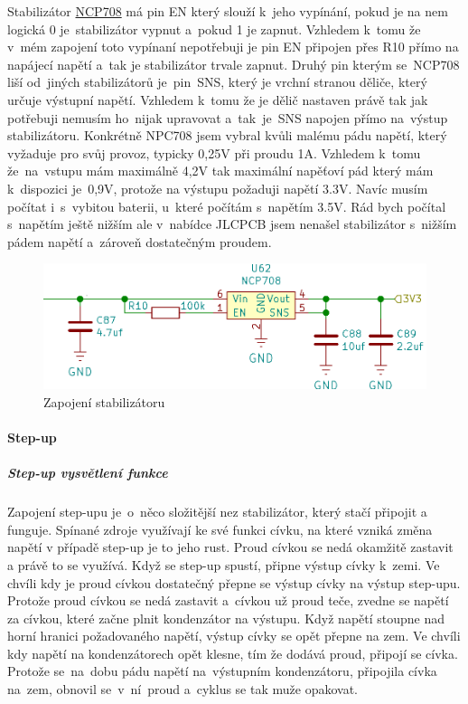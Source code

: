Stabilizátor \href{https://datasheet.lcsc.com/szlcsc/ON-Semicon-ON-NCP708MU330TAG_C183178.pdf}{NCP708} má pin EN který slouží k~jeho vypínání, 
pokud je na nem logická 0 je~stabilizátor vypnut a~pokud 1 je zapnut. Vzhledem k~tomu že v~mém zapojení toto vypínaní nepotřebuji je pin EN připojen 
přes R10 přímo na napájecí napětí a~tak je stabilizátor trvale zapnut. Druhý pin kterým se~NCP708 liší od~jiných stabilizátorů je~pin~SNS, 
který je vrchní stranou děliče, který určuje výstupní napětí. Vzhledem k~tomu že je dělič nastaven právě tak jak potřebuji nemusím ho~nijak 
upravovat a~tak~je~SNS napojen přímo na~výstup stabilizátoru. %
Konkrétně NPC708 jsem vybral kvůli malému pádu napětí, který vyžaduje pro svůj provoz, typicky 0,25V při proudu 1A. Vzhledem k~tomu že~na~vstupu 
mám maximálně 4,2V tak maximální napěťoví pád který mám k~dispozici je~0,9V, protože na výstupu požaduji napětí 3.3V. Navíc musím počítat 
i~s~vybitou baterii, u~které počítám s~napětím 3.5V. Rád bych počítal s~napětím ještě nižším ale v~nabídce JLCPCB jsem nenašel stabilizátor 
s~nižším pádem napětí a~zároveň dostatečným proudem. 

\begin{figure}[htbp]
    \centering
    \includegraphics[width=400pt]{kapitoly/obrazky/E4/napajeni/stabilizator.png}
    \caption{Zapojení stabilizátoru}
    \label{fig:E4-stabilizator}
\end{figure}

\paragraph*{Step-up}

\subparagraph*{Step-up vysvětlení funkce}
Zapojení step-upu je~o~něco složitější nez stabilizátor, který stačí připojit a funguje. Spínané zdroje využívají ke své funkci cívku, na které
vzniká změna napětí v případě step-up je to jeho rust. Proud cívkou se nedá okamžitě zastavit a právě to se využívá. 
Když se step-up spustí, připne výstup cívky k~zemi. Ve chvíli kdy je proud cívkou dostatečný přepne se výstup cívky na výstup step-upu.
Protože proud cívkou se nedá zastavit a~cívkou už proud teče, zvedne se napětí za cívkou, které začne plnit kondenzátor na výstupu.
Když napětí stoupne nad horní hranici požadovaného napětí, výstup cívky se opět přepne na zem. Ve chvíli kdy napětí na kondenzátorech opět 
klesne, tím že dodává proud, připojí se cívka. Protože se~na~dobu pádu napětí na~výstupním kondenzátoru, připojila cívka na~zem, obnovil 
se~v~ní~proud a~cyklus se tak muže opakovat.


